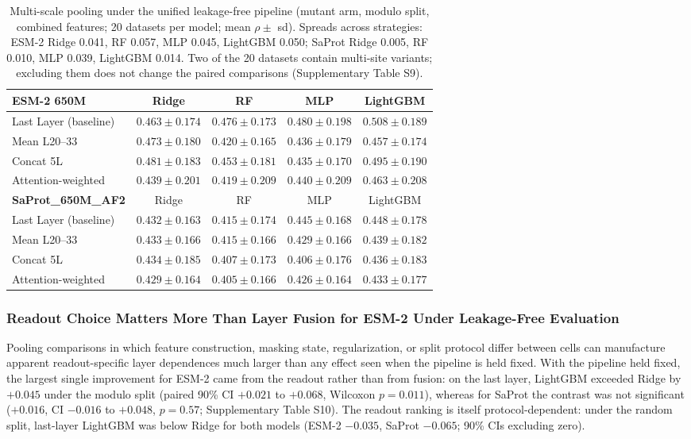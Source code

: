 \documentclass[11pt,a4paper]{article}
\newcommand{\revised}[1]{#1}
\newcommand{\rtwo}[1]{#1}
\newcommand{\rthree}[1]{#1}
\begin{document}
\begin{table}[ht]
\centering
\caption{\revised{Multi-scale pooling under the unified leakage-free pipeline (mutant
arm, modulo split, combined features; 20 datasets per model; mean $\rho \pm$ sd).
Spreads across strategies: ESM-2 Ridge 0.041, RF 0.057, MLP 0.045, LightGBM 0.050;
SaProt Ridge 0.005, RF 0.010, MLP 0.039, LightGBM 0.014. \rthree{Two of the 20 datasets
contain multi-site variants; excluding them does not change the paired comparisons
(Supplementary Table S9).}}}
\label{tab:pooling}
\begin{tabular}{lcccc}
\toprule
\textbf{ESM-2 650M} & Ridge & RF & MLP & LightGBM \\
\midrule
Last Layer (baseline) & $0.463 \pm 0.174$ & $0.476 \pm 0.173$ & $0.480 \pm 0.198$ & $\mathbf{0.508} \pm 0.189$ \\
Mean L20--33          & $0.473 \pm 0.180$ & $0.420 \pm 0.165$ & $0.436 \pm 0.179$ & $0.457 \pm 0.174$ \\
Concat 5L             & $0.481 \pm 0.183$ & $0.453 \pm 0.181$ & $0.435 \pm 0.170$ & $0.495 \pm 0.190$ \\
Attention-weighted    & $0.439 \pm 0.201$ & $0.419 \pm 0.209$ & $0.440 \pm 0.209$ & $0.463 \pm 0.208$ \\
\midrule
\textbf{SaProt\_650M\_AF2} & Ridge & RF & MLP & LightGBM \\
\midrule
Last Layer (baseline) & $0.432 \pm 0.163$ & $0.415 \pm 0.174$ & $0.445 \pm 0.168$ & $\mathbf{0.448} \pm 0.178$ \\
Mean L20--33          & $0.433 \pm 0.166$ & $0.415 \pm 0.166$ & $0.429 \pm 0.166$ & $0.439 \pm 0.182$ \\
Concat 5L             & $0.434 \pm 0.185$ & $0.407 \pm 0.173$ & $0.406 \pm 0.176$ & $0.436 \pm 0.183$ \\
Attention-weighted    & $0.429 \pm 0.164$ & $0.405 \pm 0.166$ & $0.426 \pm 0.164$ & $0.433 \pm 0.177$ \\
\bottomrule
\end{tabular}
\end{table}

\subsubsection{\rtwo{Readout Choice Matters More Than Layer Fusion for ESM-2} \rthree{Under Leakage-Free Evaluation}}

\rtwo{Pooling comparisons in which feature construction, masking state,
regularization, or split protocol differ between cells can manufacture apparent
readout-specific layer dependences much larger than any effect seen when the pipeline
is held fixed. With the pipeline held fixed, the largest single improvement for ESM-2
came from the readout rather than from fusion: on the last layer, LightGBM exceeded
Ridge by $+0.045$ under the modulo split (paired 90\% CI $+0.021$ to $+0.068$,
Wilcoxon $p = 0.011$), whereas for SaProt the contrast was not significant
($+0.016$, CI $-0.016$ to $+0.048$, $p = 0.57$; Supplementary Table \rthree{S10}).}
\rthree{The readout ranking is itself protocol-dependent: under the random split,
last-layer LightGBM was below Ridge for both models (ESM-2 $-0.035$, SaProt $-0.065$;
90\% CIs excluding zero).}
\end{document}

